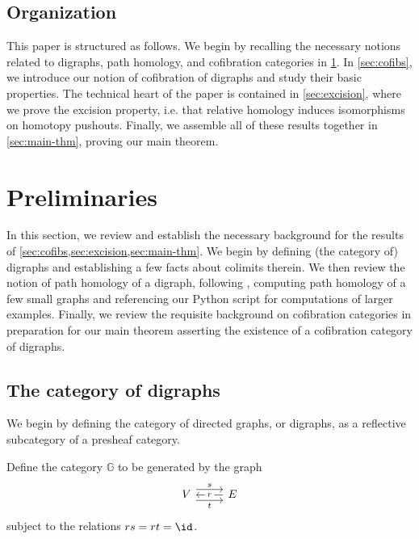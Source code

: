 \subsection{Organization}
This paper is structured as follows.
We begin by recalling the necessary notions related to digraphs, path homology, and cofibration categories in \cref{sec:preliminaries}.
In \cref{sec:cofibs}, we introduce our notion of cofibration of digraphs and study their basic properties.
The technical heart of the paper is contained in \cref{sec:excision}, where we prove the excision property, i.e. that relative homology induces isomorphisms on homotopy pushouts.
Finally, we assemble all of these results together in \cref{sec:main-thm}, proving our main theorem.

\section{Preliminaries} \label{sec:preliminaries}

In this section, we review and establish the necessary background for the results of \cref{sec:cofibs,sec:excision,sec:main-thm}.
We begin by defining (the category of) digraphs and establishing a few facts about colimits therein.
We then review the notion of path homology of a digraph, following \cite{grigor'yan-lin-muranov-yau:unpublished,grigor'yan-lin-muranov-yau:homotopy,grigor'yan-lin-muranov-yau}, computing path homology of a few small graphs and referencing our Python script \cite{python_script} for computations of larger examples.
Finally, we review the requisite background on cofibration categories in preparation for our main theorem asserting the existence of a cofibration category of digraphs.

\subsection{The category of digraphs}

We begin by defining the category of directed graphs, or digraphs, as a reflective subcategory of a presheaf category.

\begin{defi}
     Define the category $\mathbb{G}$ to be generated by the graph
 \[   \begin{tikzcd}
    V\rar["s",shift left=2] \rar["t"',shift right=2] & E\lar["r" description]
    \end{tikzcd}\]
    subject to the relations $rs=rt=\id$.
\end{defi}

